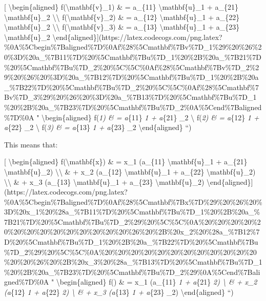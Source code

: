 \documentclass[]{article}
\begin{document}
{[} \textbackslash{}begin\{aligned\} f(\textbackslash{}mathbf\{v\}\_1) \& =
a\_\{11\} \textbackslash{}mathbf\{u\}\_1 + a\_\{21\}
\textbackslash{}mathbf\{u\}\_2 \textbackslash{}\textbackslash{}
f(\textbackslash{}mathbf\{v\}\_2) \& = a\_\{12\} \textbackslash{}mathbf\{u\}\_1
+ a\_\{22\} \textbackslash{}mathbf\{u\}\_2 \textbackslash{}\textbackslash{}
f(\textbackslash{}mathbf\{v\}\_3) \& = a\_\{13\} \textbackslash{}mathbf\{u\}\_1
+ a\_\{23\} \textbackslash{}mathbf\{u\}\_2
\textbackslash{}end\{aligned\}{]}(https://latex.codecogs.com/png.latex?\%0A\%5Cbegin\%7Baligned\%7D\%0Af\%28\%5Cmathbf\%7Bv\%7D\_1\%29\%20\%26\%20\%3D\%20a\_\%7B11\%7D\%20\%5Cmathbf\%7Bu\%7D\_1\%20\%2B\%20a\_\%7B21\%7D\%20\%5Cmathbf\%7Bu\%7D\_2\%20\%5C\%5C\%0Af\%28\%5Cmathbf\%7Bv\%7D\_2\%29\%20\%26\%20\%3D\%20a\_\%7B12\%7D\%20\%5Cmathbf\%7Bu\%7D\_1\%20\%2B\%20a\_\%7B22\%7D\%20\%5Cmathbf\%7Bu\%7D\_2\%20\%5C\%5C\%0Af\%28\%5Cmathbf\%7Bv\%7D\_3\%29\%20\%26\%20\%3D\%20a\_\%7B13\%7D\%20\%5Cmathbf\%7Bu\%7D\_1\%20\%2B\%20a\_\%7B23\%7D\%20\%5Cmathbf\%7Bu\%7D\_2\%0A\%5Cend\%7Baligned\%7D\%0A
" \textbackslash{}begin\{aligned\} f(\emph{1) \& = a}\{11\}
\emph{1 + a}\{21\} \_2 \textbackslash{} f(\emph{2)
\& = a}\{12\} \emph{1 + a}\{22\} \_2 \textbackslash{}
f(\emph{3) \& = a}\{13\} \emph{1 + a}\{23\} \_2
\textbackslash{}end\{aligned\} ``)

This means that:

{[} \textbackslash{}begin\{aligned\} f(\textbackslash{}mathbf\{x\}) \& = x\_1
(a\_\{11\} \textbackslash{}mathbf\{u\}\_1 + a\_\{21\}
\textbackslash{}mathbf\{u\}\_2) \textbackslash{}\textbackslash{} \& + x\_2
(a\_\{12\} \textbackslash{}mathbf\{u\}\_1 + a\_\{22\}
\textbackslash{}mathbf\{u\}\_2) \textbackslash{}\textbackslash{} \& + x\_3
(a\_\{13\} \textbackslash{}mathbf\{u\}\_1 + a\_\{23\}
\textbackslash{}mathbf\{u\}\_2)
\textbackslash{}end\{aligned\}{]}(https://latex.codecogs.com/png.latex?\%0A\%5Cbegin\%7Baligned\%7D\%0Af\%28\%5Cmathbf\%7Bx\%7D\%29\%20\%26\%20\%3D\%20x\_1\%20\%28a\_\%7B11\%7D\%20\%5Cmathbf\%7Bu\%7D\_1\%20\%2B\%20a\_\%7B21\%7D\%20\%5Cmathbf\%7Bu\%7D\_2\%29\%20\%5C\%5C\%0A\%20\%20\%20\%20\%20\%20\%20\%20\%20\%20\%20\%20\%20\%20\%26\%20\%2B\%20x\_2\%20\%28a\_\%7B12\%7D\%20\%5Cmathbf\%7Bu\%7D\_1\%20\%2B\%20a\_\%7B22\%7D\%20\%5Cmathbf\%7Bu\%7D\_2\%29\%20\%5C\%5C\%0A\%20\%20\%20\%20\%20\%20\%20\%20\%20\%20\%20\%20\%20\%20\%26\%20\%2B\%20x\_3\%20\%28a\_\%7B13\%7D\%20\%5Cmathbf\%7Bu\%7D\_1\%20\%2B\%20a\_\%7B23\%7D\%20\%5Cmathbf\%7Bu\%7D\_2\%29\%0A\%5Cend\%7Baligned\%7D\%0A
" \textbackslash{}begin\{aligned\} f() \& = x\_1 (a\_\{11\}
\emph{1 + a}\{21\} \emph{2) \textbackslash{} \& + x\_2
(a}\{12\} \emph{1 + a}\{22\} \emph{2) \textbackslash{} \& +
x\_3 (a}\{13\} \emph{1 + a}\{23\} \_2)
\textbackslash{}end\{aligned\} ``)
\end{document}
